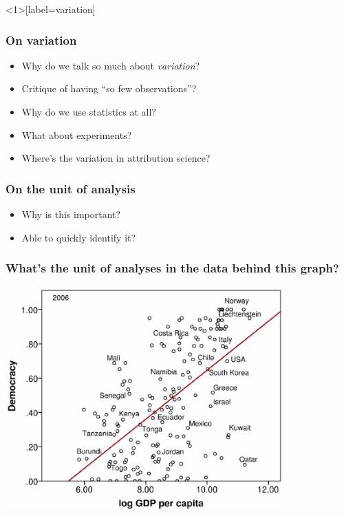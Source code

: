 \documentclass[aspectratio=43]{beamer}
\begin{document}
\begin{frame}<1>[label=variation]
\frametitle{On variation}
\centering

\begin{itemize}
  \item Why do we talk so much about \textit{variation}?
  \item<2-> Critique of having ``so few observations''?
  \item<2-> Why do we use statistics at all?
  \item<2-> What about experiments?
  \item<2-> Where's the variation in attribution science?
\end{itemize}

\end{frame}



\begin{frame}
\frametitle{On the unit of analysis}
\centering

\begin{itemize}
  \item Why is this important?
  \item<2-> Able to quickly identify it?
\end{itemize}

\end{frame}
  

\begin{frame}
\frametitle{What's the unit of analyses in the data behind this graph?}
\centering

\includegraphics[width = 0.8\textwidth]{../img/ua1}

\end{frame}
\end{document}
